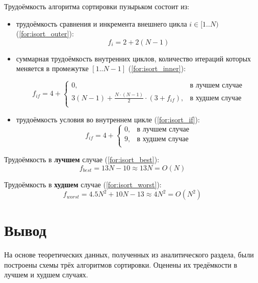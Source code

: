 \documentclass[12pt]{report}
\begin{document}
Трудоёмкость алгоритма сортировки пузырьком состоит из:
\begin{itemize}
	\item трудоёмкость сравнения и инкремента внешнего цикла $i \in [1..N)$ (\ref{for:isort_outer}):
	\begin{equation}
	\label{for:isort_outer}
	f_{i} = 2 + 2(N - 1)
	\end{equation}
	\item суммарная трудоёмкость внутренних циклов, количество итераций которых меняется в промежутке $[1..N-1]$ (\ref{for:isort_inner}):

	\begin{equation}
	\label{for:isort_inner}
	f_{if} = 4 + \begin{cases}
		0, & \text{в лучшем случае}\\
		3(N - 1) + \frac{N \cdot (N - 1)}{2} \cdot (3 + f_{if}), & \text{в худшем случае}\\
	\end{cases}
	\end{equation}

	\item трудоёмкость условия во внутреннем цикле (\ref{for:isort_if}):
	\begin{equation}
	\label{for:isort_if}
	f_{if} = 4 + \begin{cases}
	0, & \text{в лучшем случае}\\
	9, & \text{в худшем случае}\\
	\end{cases}
	\end{equation}
\end{itemize}

Трудоёмкость в \textbf{лучшем} случае (\ref{for:isort_best}):
\begin{equation}
\label{for:isort_best}
f_{best} = 13N - 10 \approx 13N = O(N)
\end{equation}

Трудоёмкость в \textbf{худшем} случае (\ref{for:isort_worst}):
\begin{equation}
\label{for:isort_worst}
f_{worst} = 4.5N^2 + 10N - 13 \approx 4N^2 = O(N^{2})
\end{equation}

\section{Вывод}

На основе теоретических данных, полученных из аналитического раздела, были построены схемы трёх алгоритмов сортировки. Оценены их тредёмкости в лучшем и худшем случаях.
\end{document}
